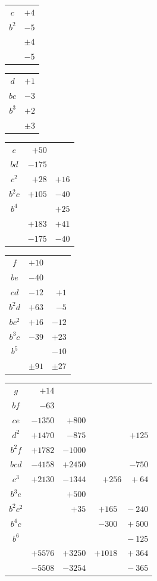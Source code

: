 \documentclass[11pt]{article}
\begin{document}
\medskip
\noindent
\begin{tabular}{|c|r|}\hline
$c$  & $+4$ \\
$b^2$ & $-5$ \\\hline
     & $\pm 4$ \\
     & $-5$ \\\hline
\end{tabular}\quad
\begin{tabular}{|c|r|}\hline
$d$  & $+1$ \\
$bc$ & $-3$ \\
$b^3$ & $+2$ \\\hline
     & $\pm 3$ \\\hline
\end{tabular}\quad
\begin{tabular}{|c|rr|}\hline
$e$    & $+50$ &       \\
$bd$   & $-175$ &      \\
$c^2$  & $+28$ & $+16$ \\
$b^2 c$ & $+105$ & $-40$ \\
$b^4$  &      & $+25$ \\\hline
       & $+183$ & $+41$ \\
       & $-175$ & $-40$ \\\hline
\end{tabular}\quad
\begin{tabular}{|c|rr|}\hline
$f$       & $+10$ & \\
$be$      & $-40$ & \\
$cd$      & $-12$ & $+1$ \\
$b^2 d$   & $+63$ & $-5$ \\
$bc^2$    & $+16$ & $-12$ \\
$b^3 c$   & $-39$ & $+23$ \\
$b^5$     &      & $-10$ \\\hline
          & $\pm 91$ & $\pm 27$ \\\hline
\end{tabular}

\medskip
\noindent
\begin{tabular}{|c|rrr|}\hline
$g$       & $+14$ &        &        \\
$bf$      & $-63$ &        &        \\
$ce$      & $-1350$ & $+800$ &      \\
$d^2$     & $+1470$ & $-875$ & $+125$ \\
$b^2 f$   & $+1782$ & $-1000$ &     \\
$bcd$     & $-4158$ & $+2450$ & $-750$ \\
$c^3$     & $+2130$ & $-1344$ & $+256\quad +64$ \\
$b^3 e$   &       & $+500$ &        \\
$b^2 c^2$ &       & $+35$ & $+165\quad -240$ \\
$b^4 c$   &       &        & $-300\quad +500$ \\
$b^6$     &       &        & $\phantom{+}\quad\;-125$ \\\hline
          & $+5576$ & $+3250$ & $+1018\quad +364$ \\
          & $-5508$ & $-3254$ & $\phantom{+1018}\quad -365$ \\\hline
\end{tabular}
\end{document}
